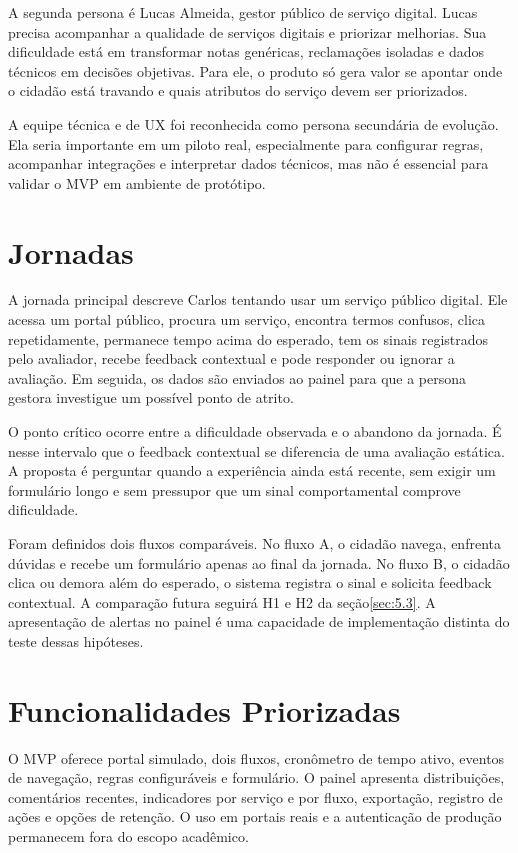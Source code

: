 A segunda persona é Lucas Almeida, gestor público de serviço digital. Lucas precisa acompanhar a qualidade de serviços digitais e priorizar melhorias. Sua dificuldade está em transformar notas genéricas, reclamações isoladas e dados técnicos em decisões objetivas. Para ele, o produto só gera valor se apontar onde o cidadão está travando e quais atributos do serviço devem ser priorizados.

A equipe técnica e de UX foi reconhecida como persona secundária de evolução. Ela seria importante em um piloto real, especialmente para configurar regras, acompanhar integrações e interpretar dados técnicos, mas não é essencial para validar o MVP em ambiente de protótipo.

\section{Jornadas}
\label{sec:4.4}

A jornada principal descreve Carlos tentando usar um serviço público digital. Ele acessa um portal público, procura um serviço, encontra termos confusos, clica repetidamente, permanece tempo acima do esperado, tem os sinais registrados pelo avaliador, recebe feedback contextual e pode responder ou ignorar a avaliação. Em seguida, os dados são enviados ao painel para que a persona gestora investigue um possível ponto de atrito.

O ponto crítico ocorre entre a dificuldade observada e o abandono da jornada. É nesse intervalo que o feedback contextual se diferencia de uma avaliação estática. A proposta é perguntar quando a experiência ainda está recente, sem exigir um formulário longo e sem pressupor que um sinal comportamental comprove dificuldade.

Foram definidos dois fluxos comparáveis. No fluxo A, o cidadão navega, enfrenta dúvidas e recebe um formulário apenas ao final da jornada. No fluxo B, o cidadão clica ou demora além do esperado, o sistema registra o sinal e solicita feedback contextual. A comparação futura seguirá H1 e H2 da seção\nobreakspace{}\ref{sec:5.3}. A apresentação de alertas no painel é uma capacidade de implementação distinta do teste dessas hipóteses.

\section{Funcionalidades Priorizadas}
\label{sec:4.5}

O MVP oferece portal simulado, dois fluxos, cronômetro de tempo ativo, eventos de navegação, regras configuráveis e formulário. O painel apresenta distribuições, comentários recentes, indicadores por serviço e por fluxo, exportação, registro de ações e opções de retenção. O uso em portais reais e a autenticação de produção permanecem fora do escopo acadêmico.

